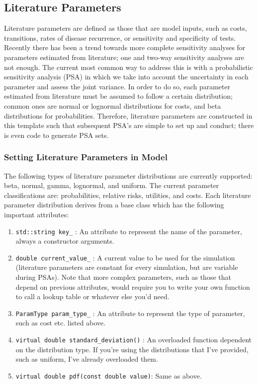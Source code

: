 \documentclass{article}
\begin{document}
\subsection{Literature Parameters}
Literature parameters are defined as those that are model inputs, such as costs, transitions, rates of disease recurrence, or sensitivity and specificity of tests. Recently there has been a trend towards more complete sensitivity analyses for parameters estimated from literature; one and two-way sensitivity analyses are not enough. The current most common way to address this is with a probabilistic sensitivity analysis (PSA) in which we take into account the uncertainty in each parameter and assess the joint variance. In order to do so, each parameter estimated from literature must be assumed to follow a certain distribution; common ones are normal or lognormal distributions for costs, and beta distributions for probabilities. Therefore, literature parameters are constructed in this template such that subsequent PSA's are simple to set up and conduct; there is even code to generate PSA sets.
\subsubsection{Setting Literature Parameters in Model}
The following types of literature parameter distributions are currently supported: beta, normal, gamma, lognormal, and uniform. The current parameter classifications are: probabilities, relative risks, utilities, and costs. Each literature parameter distribution derives from a base class which has the following important attributes:
\vspace{-2.5mm}
\begin{enumerate}
    \item \verb|std::string key_| : An attribute to represent the name of the parameter, always a constructor arguments. \vspace{-2.5mm}
    \item \verb|double current_value_| : A current value to be used for the simulation (literature parameters are constant for every simulation, but are variable during PSAs). Note that more complex parameters, such as those that depend on previous attributes, would require you to write your own function to call a lookup table or whatever else you'd need. \vspace{-2.5mm}
    \item \verb|ParamType param_type_| : An attribute to represent the type of parameter, such as cost etc. listed above. \vspace{-2.5mm}
    \item \verb|virtual double standard_deviation()| : An overloaded function dependent on the distribution type. If you're using the distributions that I've provided, such as uniform, I've already overloaded them. \vspace{-2.5mm}
    \item \verb|virtual double pdf(const double value)|: Same as above. \vspace{-2.5mm}
\end{enumerate}
\end{document}
